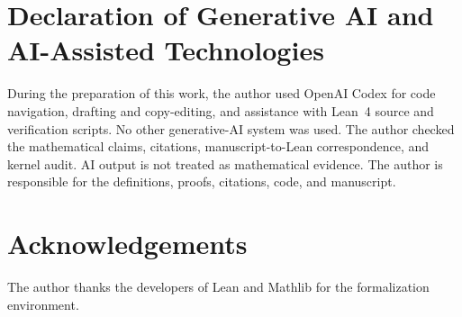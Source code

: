 \documentclass[11pt]{article}
\theoremstyle{definition}
\begin{document}
\section*{Declaration of Generative AI and AI-Assisted Technologies}

During the preparation of this work, the author used OpenAI Codex for code
navigation, drafting and copy-editing, and assistance with Lean~4 source and
verification scripts.  No other generative-AI system was used.  The author
checked the mathematical claims, citations, manuscript-to-Lean
correspondence, and kernel audit.  AI output is not treated as mathematical
evidence.  The author is responsible for the definitions, proofs, citations,
code, and manuscript.

\section*{Acknowledgements}

The author thanks the developers of Lean and Mathlib for the formalization
environment.



\end{document}
